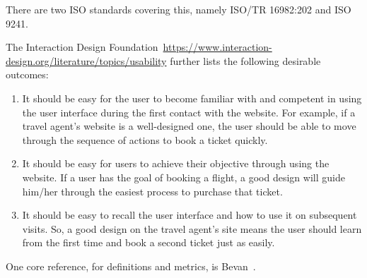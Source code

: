 \documentclass[letterpaper,cleveref]{lipics-v2019}
\theoremstyle{definition}
\begin{document}
There are two ISO standards covering this, namely ISO/TR 16982:202 and ISO 9241. 

The Interaction Design Foundation~\url{https://www.interaction-design.org/literature/topics/usability}
further lists the following desirable outcomes:
\begin{enumerate}
\item It should be easy for the user to become familiar with and competent in using
the user interface during the first contact with the website. For example, if a
travel agent’s website is a well-designed one, the user should be able to move
through the sequence of actions to book a ticket quickly.
\item It should be easy for users to achieve their objective through using the
website. If a user has the goal of booking a flight, a good design will guide
him/her through the easiest process to purchase that ticket.
\item It should be easy to recall the user interface and how to use it on
subsequent visits. So, a good design on the travel agent’s site means the user
should learn from the first time and book a second ticket just as easily.
\end{enumerate}

One core reference, for definitions and metrics, is Bevan~\cite{bevan1995measuring}.
\end{document}
